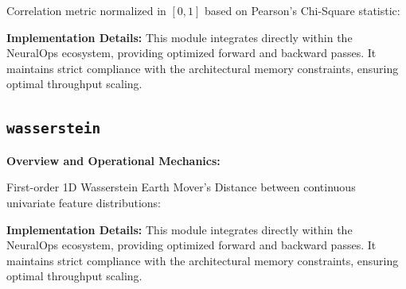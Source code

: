 Correlation metric normalized in $[0, 1]$ based on Pearson's Chi-Square statistic:

\textbf{Implementation Details:}
This module integrates directly within the NeuralOps ecosystem, providing optimized forward and backward passes. It maintains strict compliance with the architectural memory constraints, ensuring optimal throughput scaling.

\subsection{\texttt{wasserstein}}
\textbf{Overview and Operational Mechanics:}

First-order 1D Wasserstein Earth Mover's Distance between continuous univariate feature distributions:

\textbf{Implementation Details:}
This module integrates directly within the NeuralOps ecosystem, providing optimized forward and backward passes. It maintains strict compliance with the architectural memory constraints, ensuring optimal throughput scaling.
